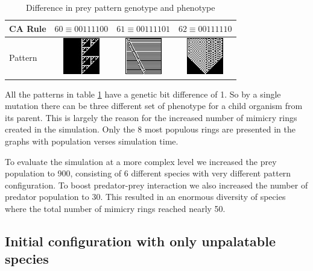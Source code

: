 \documentclass[letterpaper]{article}
\numberwithin{equation}{section}
\begin{document}
\begin{table}[h]
\small
\centering
\setlength\tabcolsep{2pt}
\begin{tabular}{|l|c|c|c|}
  \hline
  CA Rule & \(60 \equiv 00111100\) & \(61 \equiv 00111101\) & \(62 \equiv 00111110 \) \\ \hline
  Pattern & \parbox[c]{2.1em}{\includegraphics[scale=0.40]{../tex/images/CARule60}} 
  				& \parbox[c]{2.1em}{\includegraphics[scale=0.40]{../tex/images/CARule61}} 
  				& \parbox[c]{2.1em}{\includegraphics[scale=0.40]{../tex/images/CARule62}}\\
  \hline
\end{tabular}
\caption{Difference in prey pattern genotype and phenotype}
\label{tab:diff-in-pattern}
\end{table}

All the patterns in table \ref{tab:diff-in-pattern} have a genetic bit difference of 1. So by a single mutation there can be three different set of phenotype for a child organism from its parent. This is largely the reason for the increased number of mimicry rings created in the simulation. Only the 8 most populous rings are presented in the graphs with population verses simulation time.

To evaluate the simulation at a more complex level we increased the prey population to 900, consisting of 6 different species with very different pattern configuration. To boost predator-prey interaction we also increased the number of predator population to 30. This resulted in an enormous diversity of species where the total number of mimicry rings reached nearly 50.

\subsection{Initial configuration with only unpalatable species}
\label{subsec:init-conf-only-unp}
\end{document}
